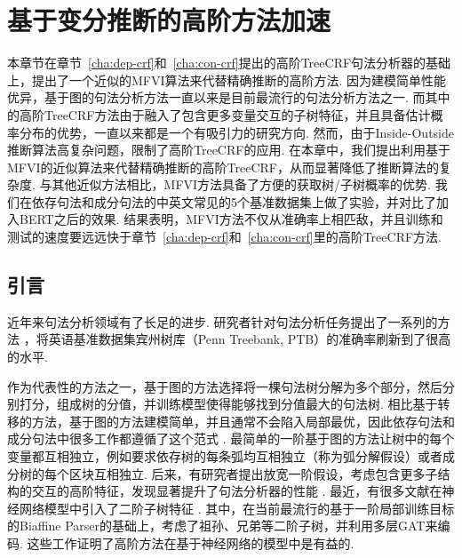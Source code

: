 \chapter{基于变分推断的高阶方法加速}
\label{cha:vi}

本章节在章节~\ref{cha:dep-crf}和~\ref{cha:con-crf}提出的高阶TreeCRF句法分析器的基础上，提出了一个近似的MFVI算法来代替精确推断的高阶方法.
因为建模简单性能优异，基于图的句法分析方法一直以来是目前最流行的句法分析方法之一.
而其中的高阶TreeCRF方法由于融入了包含更多变量交互的子树特征，并且具备估计概率分布的优势，一直以来都是一个有吸引力的研究方向.
然而，由于Inside-Outside推断算法高复杂问题，限制了高阶TreeCRF的应用.
在本章中，我们提出利用基于MFVI的近似算法来代替精确推断的高阶TreeCRF，从而显著降低了推断算法的复杂度.
与其他近似方法相比，MFVI方法具备了方便的获取树/子树概率的优势.
我们在依存句法和成分句法的中英文常见的5个基准数据集上做了实验，并对比了加入BERT之后的效果.
结果表明，MFVI方法不仅从准确率上相匹敌，并且训练和测试的速度要远远快于章节~\ref{cha:dep-crf}和~\ref{cha:con-crf}里的高阶TreeCRF方法.

\section{引言}\label{sec:vi-intro}
近年来句法分析领域有了长足的进步.
研究者针对句法分析任务提出了一系列的方法 \citep{dozat-etal-2017-biaffine,gomez-rodriguez-vilares-2018-constituent,ji-etal-2019-graph,zhang-etal-2020-fast,wei-etal-2020-span}，将英语基准数据集宾州树库（Penn Treebank, PTB）的准确率刷新到了很高的水平.

作为代表性的方法之一，基于图的方法选择将一棵句法树分解为多个部分，然后分别打分，组成树的分值，并训练模型使得能够找到分值最大的句法树.
相比基于转移的方法，基于图的方法建模简单，并且通常不会陷入局部最优，因此依存句法和成分句法中很多工作都遵循了这个范式 \citep{mcdonald-etal-2005-non,mcdonald-etal-2005-online,taskar-etal-2004-max}.
最简单的一阶基于图的方法让树中的每个变量都互相独立，例如要求依存树的每条弧均互相独立（称为弧分解假设）或者成分树的每个区块互相独立.
后来，有研究者提出放宽一阶假设，考虑包含更多子结构的交互的高阶特征，发现显著提升了句法分析器的性能 \citep{mcdonald-pereira-2006-online,koo-collins-2010-efficient,ma-zhao-2012-fourth}.
最近，有很多文献在神经网络模型中引入了二阶子树特征 \citep{chen-manning-2014-fast,ma-hovy-2017-neural,pei-etal-2015-effective}.
其中，\citet{ji-etal-2019-graph}在当前最流行的基于一阶局部训练目标的Biaffine Parser的基础上，考虑了祖孙、兄弟等二阶子树，并利用多层GAT来编码.
这些工作证明了高阶方法在基于神经网络的模型中是有益的.

